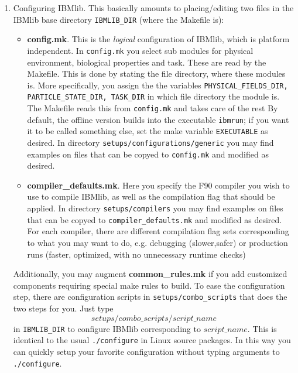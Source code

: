 \begin{enumerate}
  \item Configuring IBMlib.  This basically amounts to placing/editing
        two files in the IBMlib base directory {\tt IBMLIB\_DIR}
        (where the Makefile is):
        \begin{itemize}
           \item {\bf config.mk}. This is the {\it logical} configuration
                 of IBMlib, which is platform independent. In {\tt config.mk}
                 you select sub modules for physical environment, biological
                 properties and task. These are read by the Makefile. This is done by 
                 stating the file directory, where these modules is. More specifically,
                 you assign the the variables 
                 {\tt PHYSICAL\_FIELDS\_DIR,  PARTICLE\_STATE\_DIR,  TASK\_DIR}
                 in which file directory the module is. The Makefile reads this
                 from {\tt config.mk} and takes care of the rest
                 By default, the offline version builds into the executable {\tt  ibmrun}; 
                 if you want it to be called something else, set the make variable 
                 {\tt EXECUTABLE} as desired. 
                 In directory {\tt setups/configurations/generic} you may find examples
                 on files that can be copyed to {\tt config.mk} and modified as desired.
           \item {\bf compiler\_defaults.mk}. Here you specify the F90 compiler you wish to
                 use to compile IBMlib, as well as the compilation flag that should be applied.
                 In directory {\tt setups/compilers} you may find examples
                 on files that can be copyed to {\tt compiler\_defaults.mk} and modified 
                 as desired. For each compiler, there are different compilation flag sets
                 corresponding to what you may want to do, e.g. debugging (slower,safer) 
                 or production runs (faster, optimized, with no unnecessary runtime checks)
        \end{itemize}
        Additionally, you may augment {\bf common\_rules.mk} if you add customized
        components requiring special make rules to build. To ease the configuration 
        step, there are configuration scripts in {\tt setups/combo\_scripts} that does the 
        two steps for you. Just type
        \[ setups/combo\_scripts/script\_name
        \]
        in  {\tt IBMLIB\_DIR} to configure IBMlib corresponding to $script\_name$.
        This is identical to the usual {\tt ./configure} in Linux source packages.
        In this way you can quickly setup your favorite configuration without typing 
        arguments to {\tt ./configure}.
           

\end{enumerate}
